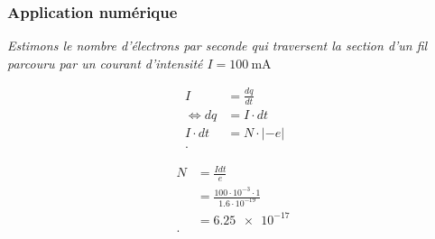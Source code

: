 \documentclass{article}
\begin{document}
\subsubsection{Application numérique}
\emph{Estimons le nombre d'électrons par seconde qui traversent la section d'un fil parcouru par un courant d'intensité $I = \SI{100}{\milli\ampere}$} 

\begin{align*}
	I &= \frac{dq}{dt} \\
	\iff dq &= I\cdot dt \\
	I\cdot dt &= N\cdot |-e| \\
.\end{align*}

\begin{align*}
	N &= \frac{Idt}{e} \\
	&= \frac{100\cdot 10^{-3}\cdot 1}{1.6\cdot 10^{-19}} \\
	&= \SI{6.25e-17}{} \\
.\end{align*}
\end{document}
